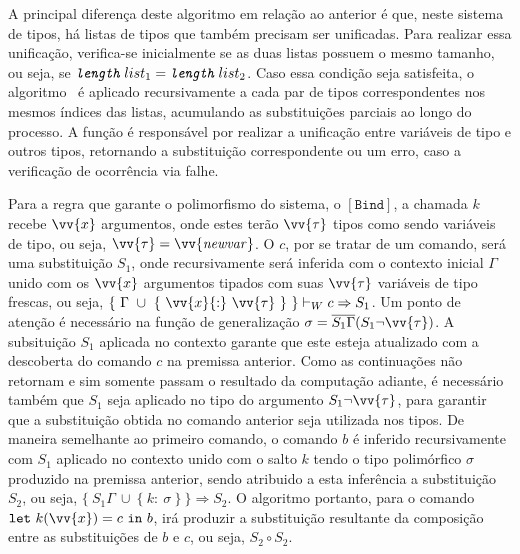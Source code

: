 A principal diferença deste algoritmo em relação ao anterior é que, neste sistema de tipos, há listas de tipos que também precisam ser unificadas.
Para realizar essa unificação, verifica-se inicialmente se as duas listas possuem o mesmo tamanho, ou seja, se $\texttt{\Length}\ list_1 = \texttt{\Length}\ list_2$.
Caso essa condição seja satisfeita, o algoritmo \Mgu\ é aplicado recursivamente a cada par de tipos correspondentes nos mesmos índices das listas, acumulando as substituições parciais ao longo do processo.
A função \texttt{\UnifyVar} é responsável por realizar a unificação entre variáveis de tipo e outros tipos, retornando a substituição correspondente ou um erro, caso a verificação de ocorrência via \texttt{\Occurs} falhe.

Para a regra que garante o polimorfismo do sistema, o $[\mathtt{Bind}]$, a chamada $k$ recebe $\vv{x}$ argumentos, onde estes terão $\vv{\tau}$ tipos como sendo variáveis de tipo, ou seja, $\vv{\tau} = \vv{\mathit{newvar}}$.
O $c$, por se tratar de um comando, será uma substituição $S_1$, onde recursivamente será inferida com o contexto inicial $\Gamma$ unido com os $\vv{x}$ argumentos tipados com suas $\vv{\tau}$ variáveis de tipo frescas, ou seja, $\{\ \Gamma\ \cup\ \{\ \vv{x}{:}\ \vv{\tau}\ \}\ \} \vdash_W c \Rightarrow S_1$.
Um ponto de atenção é necessário na função de generalização $\sigma = \overline{S_1\Gamma}(S_1 \neg\vv{\tau})$.
A subsituição $S_1$ aplicada no contexto garante que este esteja atualizado com a descoberta do comando $c$ na premissa anterior.
Como as continuações não retornam e sim somente passam o resultado da computação adiante, é necessário também que $S_1$ seja aplicado no tipo do argumento $S_1 \neg\vv{\tau}$, para garantir que a substituição obtida no comando anterior seja utilizada nos tipos.
De maneira semelhante ao primeiro comando, o comando $b$ é inferido recursivamente com $S_1$ aplicado no contexto unido com o salto $k$ tendo o tipo polimórfico $\sigma$ produzido na premissa anterior, sendo atribuido a esta inferência a substituição $S_2$, ou seja, $\{\ S_1\Gamma\ \cup\ \{\ k{:}\ \sigma \ \} \ \} \Rightarrow S_2$.
O algoritmo portanto, para o comando $\mathtt{let}\ k(\vv{x}) = c\ \mathtt{in}\ b$, irá produzir a substituição resultante da composição entre as substituições de $b$ e $c$, ou seja, $S_2 \circ S_2$.
